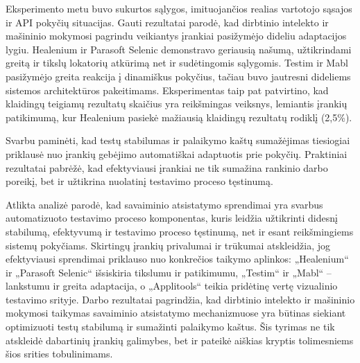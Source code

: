 \documentclass[
]{VUMIFPSkursinis}
\begin{document}
Eksperimento metu buvo sukurtos sąlygos, imituojančios realias vartotojo sąsajos ir API pokyčių situacijas. Gauti rezultatai parodė, kad dirbtinio intelekto ir mašininio mokymosi pagrindu veikiantys įrankiai pasižymėjo dideliu adaptacijos lygiu. Healenium ir Parasoft Selenic demonstravo geriausią našumą, užtikrindami greitą ir tikslų lokatorių atkūrimą net ir sudėtingomis sąlygomis. Testim ir Mabl pasižymėjo greita reakcija į dinamiškus pokyčius, tačiau buvo jautresni dideliems sistemos architektūros pakeitimams. Eksperimentas taip pat patvirtino, kad klaidingų teigiamų rezultatų skaičius yra reikšmingas veiksnys, lemiantis įrankių patikimumą, kur Healenium pasiekė mažiausią klaidingų rezultatų rodiklį (2,5\%).

Svarbu paminėti, kad testų stabilumas ir palaikymo kaštų sumažėjimas tiesiogiai priklausė nuo įrankių gebėjimo automatiškai adaptuotis prie pokyčių. Praktiniai rezultatai pabrėžė, kad efektyviausi įrankiai ne tik sumažina rankinio darbo poreikį, bet ir užtikrina nuolatinį testavimo proceso tęstinumą.


Atlikta analizė parodė, kad savaiminio atsistatymo sprendimai yra svarbus automatizuoto testavimo proceso komponentas, kuris leidžia užtikrinti didesnį stabilumą, efektyvumą ir testavimo proceso tęstinumą, net ir esant reikšmingiems sistemų pokyčiams. Skirtingų įrankių privalumai ir trūkumai atskleidžia, jog efektyviausi sprendimai priklauso nuo konkrečios taikymo aplinkos: „Healenium“ ir „Parasoft Selenic“ išsiskiria tikslumu ir patikimumu, „Testim“ ir „Mabl“ – lankstumu ir greita adaptacija, o „Applitools“ teikia pridėtinę vertę vizualinio testavimo srityje. Darbo rezultatai pagrindžia, kad dirbtinio intelekto ir mašininio mokymosi taikymas savaiminio atsistatymo mechanizmuose yra būtinas siekiant optimizuoti testų stabilumą ir sumažinti palaikymo kaštus. Šis tyrimas ne tik atskleidė dabartinių įrankių galimybes, bet ir pateikė aiškias kryptis tolimesniems šios srities tobulinimams.

\printbibliography  %
\end{document}
